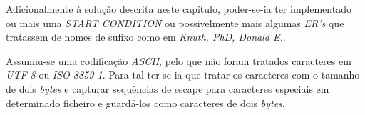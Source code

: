 Adicionalmente à solução descrita neste capitulo, poder-se-ia ter implementado
ou mais uma \emph{START CONDITION} ou possivelmente mais algumas \emph{ER's}
que tratassem de nomes de sufixo como em  \emph{Knuth, PhD, Donald E.}.

Assumiu-se uma codificação \emph{ASCII}, pelo que não foram tratados caracteres
em \emph{UTF-8} ou \emph{ISO 8859-1}. Para tal ter-se-ia que tratar os
caracteres com o tamanho de dois \emph{bytes} e capturar sequências de escape
para caracteres especiais em determinado ficheiro  e guardá-los
como caracteres de dois \emph{bytes}. 






